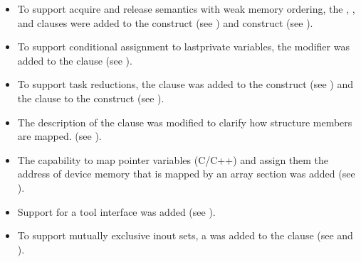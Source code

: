 \begin{itemize}
\item To support acquire and release semantics with weak memory ordering, the
    , , and  clauses were added to
    the  construct (see ) and
     construct (see ).

\item To support conditional assignment to lastprivate variables, the
 modifier was added to the  clause (see
).

\item To support task reductions, the 
clause was added to the  construct (see ) and the 
clause to the  construct (see ).

\item The description of the  clause was modified to clarify how structure
members are mapped. (see ).

\item The capability to map pointer variables (C/C++) and assign them the address of
device memory that is mapped by an array section was added (see ).

\item Support for a tool interface was added (see ).

\item To support mutually exclusive inout sets, a  
      was added to the  clause (see  and
      ).
\end{itemize}


